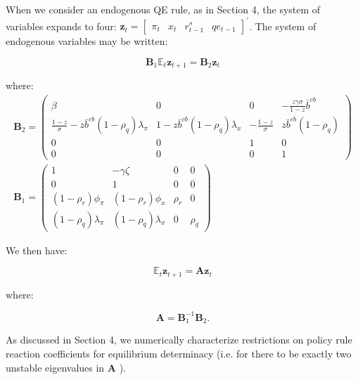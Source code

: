 \documentclass[10pt]{article}
\begin{document}
When we consider an endogenous QE rule, as in Section 4, the system of variables expands to four: $\mathbf{z}_{t}=\left[\begin{array}{llll}\pi_{t} & x_{t} & r_{t-1}^{s} & q e_{t-1}\end{array}\right]^{\prime}$. The system of endogenous variables may be written:

\begin{equation*}
\mathbf{B}_{1} \mathbb{E}_{t} \mathbf{z}_{t+1}=\mathbf{B}_{2} \mathbf{z}_{t} \tag{C.12}
\end{equation*}

where:\\
\begin{gather*}
\mathbf{B}_{2}=\left(\begin{array}{cccc}
\beta & 0 & 0 & -\frac{z \gamma \sigma}{1-z} \bar{b}^{c b} \\
\frac{1-z}{\sigma}-z \bar{b}^{c b}\left(1-\rho_{q}\right) \lambda_{\pi} & 1-z \bar{b}^{c b}\left(1-\rho_{q}\right) \lambda_{x} & -\frac{1-z}{\sigma} & z \bar{b}^{c b}\left(1-\rho_{q}\right) \\
0 & 0 & 1 & 0 \\
0 & 0 & 0 & 1
\end{array}\right)  \tag{C.13}\\
\mathbf{B}_{1}=\left(\begin{array}{cccc}
1 & -\gamma \zeta & 0 & 0 \\
0 & 1 & 0 & 0 \\
\left(1-\rho_{r}\right) \phi_{\pi} & \left(1-\rho_{r}\right) \phi_{x} & \rho_{r} & 0 \\
\left(1-\rho_{q}\right) \lambda_{\pi} & \left(1-\rho_{q}\right) \lambda_{x} & 0 & \rho_{q}
\end{array}\right) \tag{C.14}
\end{gather*}

We then have:

\begin{equation*}
\mathbb{E}_{t} \mathbf{z}_{t+1}=\mathbf{A} \mathbf{z}_{t} \tag{C.15}
\end{equation*}

where:

\begin{equation*}
\mathbf{A}=\mathbf{B}_{1}^{-1} \mathbf{B}_{2} . \tag{C.16}
\end{equation*}

As discussed in Section 4, we numerically characterize restrictions on policy rule reaction coefficients for equilibrium determinacy (i.e. for there to be exactly two unstable eigenvalues in $\mathbf{A}$ ).
\end{document}
